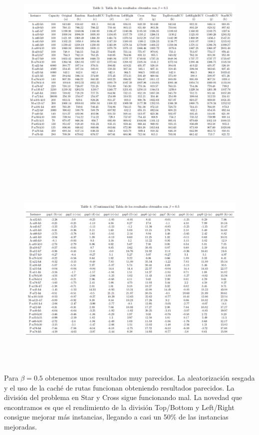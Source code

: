 \documentclass[11pt]{article} %
\begin{document}
\begin{enumerate}
\begin{figure}[H]
\centering
\includegraphics[width=\linewidth, height=10cm]{table051.png} 
\end{figure}
\begin{figure}[H]
\includegraphics[width=\linewidth, height=10cm]{table052.png} 
\label{fig:subim1}
\end{figure}

Para $\beta = 0.5$ obtenemos unos resultados muy parecidos. La aleatorización sesgada y el uso de la caché de rutas funcionan obteniendo resultados parecidos. La división del problema en Star y Cross sigue funcionando mal. 
La novedad que encontramos es que el rendimiento de la división Top/Bottom y Left/Right consigue mejorar más instancias, llegando a casi un 50\% de las instancias mejoradas.\\


\end{enumerate}
\end{document}
